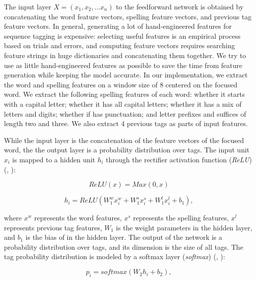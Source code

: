 The input layer $X=\left( x_{1},x_{2},\ldots x_{n}\right)$ to the feedforward network is obtained by concatenating the word feature vectors, spelling feature vectors, and previous tag feature vectors. In general, generating a lot of hand-engineered features for sequence tagging is expensive: selecting useful features is an empirical process based on trials and errors, and computing feature vectors requires searching feature strings in huge dictionaries and concatenating them together. We try to use as little hand-engineered features as possible to save the time from feature generation while keeping the model accurate. In our implementation, we extract the word and spelling features on a window size of 8 centered on the focused word. We extract the following spelling features of each word: whether it starts with a capital letter; whether it has all capital letters; whether it has a mix of letters and digits; whether if has punctuation; and letter prefixes and suffices of length two and three. We also extract 4 previous tags as parts of input features.

While the input layer is the concatenation of the feature vectors of the focused word, the the output layer is a probability distribution over tags. The input unit $x_{i}$ is mapped to a hidden unit $h_{i}$ through the rectifier activation function (\textit{ReLU}) (\citeauthor{nair2010rectified}, \citeyear{nair2010rectified}):

\begin{equation}
\textit{ReLU}\left(x\right) = \textit{Max}\left(0,x\right)
\end{equation}

\begin{equation}
h_{i}=\textit{ReLU}\left( W_{1}^{w}x_{i}^{w}+W_{1}^{s}x_{i}^{s}+W_{1}^{l}x_{i}^{l}+b_{1}\right),
\end{equation}

where $x^{w}$ represents the word features, $x^{s}$ represents the spelling features, $x^{l}$ represents previous tag features, $W_{1}$ is the weight parameters in the hidden layer, and $b_{1}$ is the bias of in the hidden layer. The output of the network is a probability distribution over tags, and its dimension is the size of all tags. The tag probability distribution is modeled by a softmax layer (\textit{softmax}) (\citeauthor{dugas2001incorporating}, \citeyear{dugas2001incorporating}):

\begin{equation}
p_{i}=\textit{softmax}\left(W_{2}h_{i}+b_{2}\right),
\end{equation}

